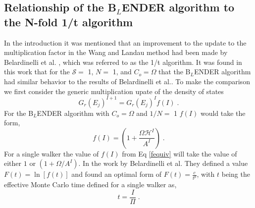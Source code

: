 \documentclass[aps,pre,reprint,superscriptaddress,showkeys]{revtex4-1}
\begin{document}
\subsection{Relationship of the B$_L$ENDER algorithm to the N-fold 1/t algorithm}
\label{test_wl}
In the introduction it was mentioned that an improvement to the update to the multiplication factor in the Wang and Landau method had been made by Belardinelli et al. \cite{saturation}, which was referred to as the 1/t algorithm. It was found in this work that for the $\mathcal{S}=$ 1, $N=$ 1, and $C_{o}=\Omega$ that the B$_L$ENDER algorithm had similar behavior to the results of Belardinelli et al.. To make the comparison we first consider the generic multiplication upate of the density of states
\begin{equation}
G_{r}(E_j)^{I+1} = G_{r}(E_j)^{I}f(I)\;.
\label{orignialform}
\end{equation}
For the B$_L$ENDER algorithm with $C_o = \Omega$ and $1/N=$ 1 $f(I)$ would take the form, 
\begin{equation}
f(I) = ( 1 +  \frac{\Omega \mathcal{H}^I }{ A^I } )\;.
\label{fequiv}
\end{equation}
For a single walker the value of $f(I)$ from Eq \ref{fequiv} will take the value of either $1$ or $(1+ \Omega/A^I)$. 
In the work by Belardinelli et al. They defined a value $F(t) = \ln[f(t)]$  and found an optimal form of $F(t) = \frac{c}{t^p}$, with $t$ being the effective Monte Carlo time defined for a single walker as,
\begin{equation}
t = \frac{I}{\Pi} \;.
\label{mcstep}
\end{equation} 
\end{document}
